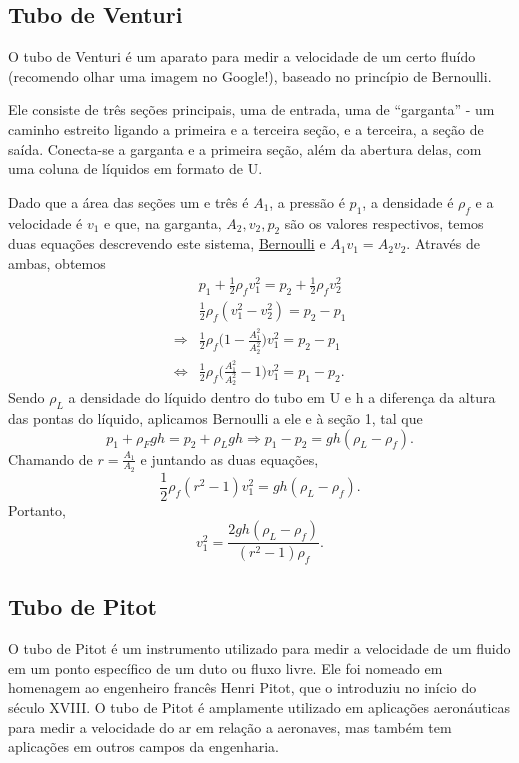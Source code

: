 \documentclass{article}
\begin{document}
\subsection{Tubo de Venturi}
O tubo de Venturi é um aparato para medir a velocidade de um certo fluído (recomendo olhar uma imagem no Google!), baseado no princípio de Bernoulli.

Ele consiste de três seções principais, uma de entrada, uma de ``garganta'' - um caminho estreito ligando a primeira e a terceira seção, e a terceira, a seção de saída.
Conecta-se a garganta e a primeira seção, além da abertura delas, com uma coluna de líquidos em formato de U.

Dado que a área das seções um e três é \(A_{1}\), a pressão é \(p_{1}\), a densidade é \(\rho_{f}\)
e a velocidade é \(v_{1}\) e que, na garganta, \(A_{2}, v_{2}, p_{2}\) são os valores respectivos, 
temos duas equações descrevendo este sistema, \hyperlink{bernoulli}{Bernoulli}
e \(A_{1}v_{1} = A_{2}v_{2}.\) Através de ambas, obtemos 
\begin{align*}
  &p_{1}+\frac{1}{2}\rho_{f}v_{1}^{2} = p_{2} + \frac{1}{2}\rho_{f}v_{2}^{2}\\
  &\frac{1}{2}\rho_{f}(v_{1}^{2}-v_{2}^{2}) = p_{2}-p_{1}\\
  \Longrightarrow &\frac{1}{2}\rho_{f}\biggl(1-\frac{A_{1}^{2}}{A_{2}^{2}}\biggr)v_{1}^{2} = p_{2}-p_{1}\\
  \Longleftrightarrow &\frac{1}{2}\rho_{f} \biggl(\frac{A_{1}^{2}}{A_{2}^{2}}-1\biggr)v_{1}^{2} = p_{1}-p_{2}.
\end{align*}
Sendo \(\rho_{L}\) a densidade do líquido dentro do tubo em U e h a diferença da altura das pontas do líquido, aplicamos Bernoulli a ele e à seção 1, tal que 
\[
  p_{1}+\rho_{F}gh = p_{2}+\rho_{L}gh \Rightarrow p_{1}-p_{2} = gh(\rho_{L}-\rho_{f}).
\]
Chamando de \(r = \frac{A_{1}}{A_{2}}\) e juntando as duas equações, 
\[
  \frac{1}{2}\rho_{f}(r^{2}-1)v_{1}^{2} = gh(\rho_{L}-\rho_{f}).
\]
Portanto, 
\[
  v_{1}^{2} = \frac{2gh(\rho_{L}-\rho _{f})}{(r^{2}-1)\rho_{f}}.
\]
\subsection{Tubo de Pitot}
O tubo de Pitot é um instrumento utilizado para medir a velocidade de um fluido
em um ponto específico de um duto ou fluxo livre. Ele foi nomeado em homenagem
ao engenheiro francês Henri Pitot, que o introduziu no início do século XVIII. 
O tubo de Pitot é amplamente utilizado em aplicações aeronáuticas para medir a 
velocidade do ar em relação a aeronaves, mas também tem aplicações em outros
campos da engenharia.
\end{document}
